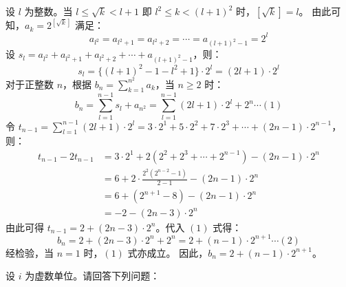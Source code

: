 \begin{questions}
\begin{solution}
    设 $l$ 为整数。当 $l \le \sqrt{k} < l+1$ 即 $l^2 \le k < (l+1)^2$ 时，$[\sqrt{k}] = l$。
    由此可知，$a_k = 2^{[\sqrt{k}]}$ 满足：
    \[ a_{l^2} = a_{l^2+1} = a_{l^2+2} = \cdots = a_{(l+1)^2-1} = 2^l \]
    设 $s_l = a_{l^2} + a_{l^2+1} + a_{l^2+2} + \cdots + a_{(l+1)^2-1}$，则：
    \[ s_l = \{(l+1)^2 - 1 - l^2 + 1\} \cdot 2^l = (2l+1) \cdot 2^l \]
    对于正整数 $n$，根据 $b_n = \sum_{k=1}^{n^2} a_k$，当 $n \ge 2$ 时：
    \[ b_n = \sum_{l=1}^{n-1} s_l + a_{n^2} = \sum_{l=1}^{n-1} (2l+1) \cdot 2^l + 2^n \cdots (1) \]
    令 $t_{n-1} = \sum_{l=1}^{n-1} (2l+1) \cdot 2^l = 3 \cdot 2^1 + 5 \cdot 2^2 + 7 \cdot 2^3 + \cdots + (2n-1) \cdot 2^{n-1}$，则：
    \begin{align*}
    t_{n-1} - 2t_{n-1} &= 3 \cdot 2^1 + 2(2^2 + 2^3 + \cdots + 2^{n-1}) - (2n-1) \cdot 2^n \\
    &= 6 + 2 \cdot \frac{2^2(2^{n-2} - 1)}{2-1} - (2n-1) \cdot 2^n \\
    &= 6 + (2^{n+1} - 8) - (2n-1) \cdot 2^n \\
    &= -2 - (2n-3) \cdot 2^n
    \end{align*}
    由此可得 $t_{n-1} = 2 + (2n-3) \cdot 2^n$。代入 $(1)$ 式得：
    \[ b_n = 2 + (2n-3) \cdot 2^n + 2^n = 2 + (n-1) \cdot 2^{n+1} \cdots (2) \]
    经检验，当 $n=1$ 时，$(1)$ 式亦成立。
    因此，$b_n = 2 + (n-1) \cdot 2^{n+1}$。
\end{solution}

\question
设 $i$ 为虚数单位。请回答下列问题：

\end{questions}
